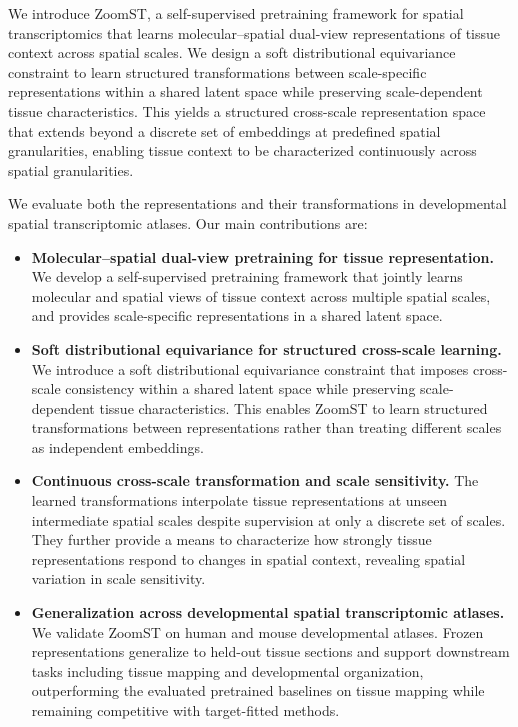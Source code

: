 We introduce ZoomST, a self-supervised pretraining framework for spatial transcriptomics that learns molecular--spatial dual-view representations of tissue context across spatial scales. We design a soft distributional equivariance constraint to learn structured transformations between scale-specific representations within a shared latent space while preserving scale-dependent tissue characteristics. This yields a structured cross-scale representation space that extends beyond a discrete set of embeddings at predefined spatial granularities, enabling tissue context to be characterized continuously across spatial granularities.

We evaluate both the representations and their transformations in developmental spatial transcriptomic atlases. Our main contributions are:

\begingroup
\setlength{\leftmargini}{1.3em}
\begin{itemize}
\item \textbf{Molecular--spatial dual-view pretraining for tissue representation.}
We develop a self-supervised pretraining framework that jointly learns molecular and spatial views of tissue context across multiple spatial scales, and provides scale-specific representations in a shared latent space.

\item \textbf{Soft distributional equivariance for structured cross-scale learning.}
We introduce a soft distributional equivariance constraint that imposes cross-scale consistency within a shared latent space while preserving scale-dependent tissue characteristics. This enables ZoomST to learn structured transformations between representations rather than treating different scales as independent embeddings.

\item \textbf{Continuous cross-scale transformation and scale sensitivity.}
The learned transformations interpolate tissue representations at unseen intermediate spatial scales despite supervision at only a discrete set of scales. They further provide a means to characterize how strongly tissue representations respond to changes in spatial context, revealing spatial variation in scale sensitivity.

\item \textbf{Generalization across developmental spatial transcriptomic atlases.}
We validate ZoomST on human and mouse developmental atlases. Frozen representations generalize to held-out tissue sections and support downstream tasks including tissue mapping and developmental organization, outperforming the evaluated pretrained baselines on tissue mapping while remaining competitive with target-fitted methods.
\end{itemize}
\endgroup
